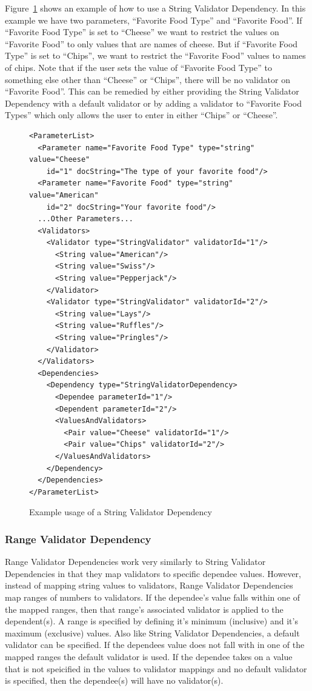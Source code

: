 Figure~\ref{StringValiDepXML} shows an example of how to use a String Validator Dependency. In this example we have two parameters, 
``Favorite Food Type''
and ``Favorite Food''. If ``Favorite Food Type'' is set to ``Cheese'' we want to restrict the values on ``Favorite Food'' to only values that are names
of cheese. But if ``Favorite Food Type'' is set to ``Chips'', we want to restrict the ``Favorite Food'' values to names of chips. Note that if the user
sets the value of ``Favorite Food Type'' to something else other than ``Cheese'' or ``Chips'', there will be no validator on ``Favorite Food''. This can
be remedied by either providing the String Validator Dependency with a default validator or by adding a validator to ``Favorite Food Types'' which only
allows the user to enter in either ``Chips'' or ``Cheese''.
\begin{figure}
\centering
{\footnotesize
\begin{verbatim}
<ParameterList>
  <Parameter name="Favorite Food Type" type="string" value="Cheese"
    id="1" docString="The type of your favorite food"/>
  <Parameter name="Favorite Food" type="string" value="American"
    id="2" docString="Your favorite food"/>
  ...Other Parameters...
  <Validators>
    <Validator type="StringValidator" validatorId="1"/>
      <String value="American"/>
      <String value="Swiss"/>
      <String value="Pepperjack"/>
    </Validator>
    <Validator type="StringValidator" validatorId="2"/>
      <String value="Lays"/>
      <String value="Ruffles"/>
      <String value="Pringles"/>
    </Validator>
  </Validators>
  <Dependencies>
    <Dependency type="StringValidatorDependency>
      <Dependee parameterId="1"/>
      <Dependent parameterId="2"/>
      <ValuesAndValidators>
        <Pair value="Cheese" validatorId="1"/>
        <Pair value="Chips" validatorId="2"/>
      </ValuesAndValidators>
    </Dependency>
  </Dependencies>
</ParameterList>
\end{verbatim}
}
\caption{Example usage of a String Validator Dependency}
\label{StringValiDepXML}
\end{figure}

\subsubsection{Range Validator Dependency}
Range Validator Dependencies work very similarly to String Validator Dependencies in that they map validators to specific dependee values. However,
instead of mapping string values to validators, Range Validator Dependencies map ranges of numbers to validators. If the dependee's value falls within one of the 
mapped ranges, then that range's associated validator is applied to the dependent(s). A range is specified by defining it's minimum (inclusive) and it's maximum (exclusive) 
values. Also like String Validator Dependencies, a default validator can be specified. If the dependees value does not fall with in one of the mapped ranges the default 
validator is used. If the dependee takes on a value that is not speicified in the values to validator mappings and no default validator is specified, then the 
dependee(s) will have no validator(s).

